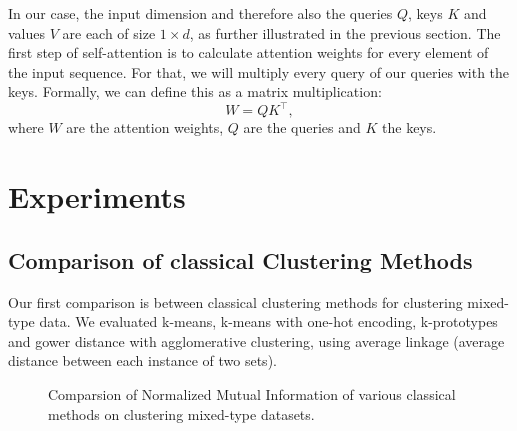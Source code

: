 In our case, the input dimension and therefore also the queries $Q$, keys $K$ and values $V$ are each of size $1 \times d$, as further illustrated in the previous section. The first step of self-attention is to calculate attention weights for every element of the input sequence. For that, we will multiply every query of our queries with the keys. Formally, we can define this as a matrix multiplication:
$$W = QK^\intercal,$$
where $W$ are the attention weights, $Q$ are the queries and $K$ the keys. 




\chapter{Experiments} \label{Experiments}

\section{Comparison of classical Clustering Methods}

Our first comparison is between classical clustering methods for clustering mixed-type data. We evaluated k-means, k-means with one-hot encoding, k-prototypes and gower distance with agglomerative clustering, using average linkage (average distance between each instance of two sets).


\begin{figure}
\begin{center}
\end{center}
\caption{Comparsion of Normalized Mutual Information of various classical methods on clustering mixed-type datasets.}
\label{classical_comparison_nmi}
\end{figure}

